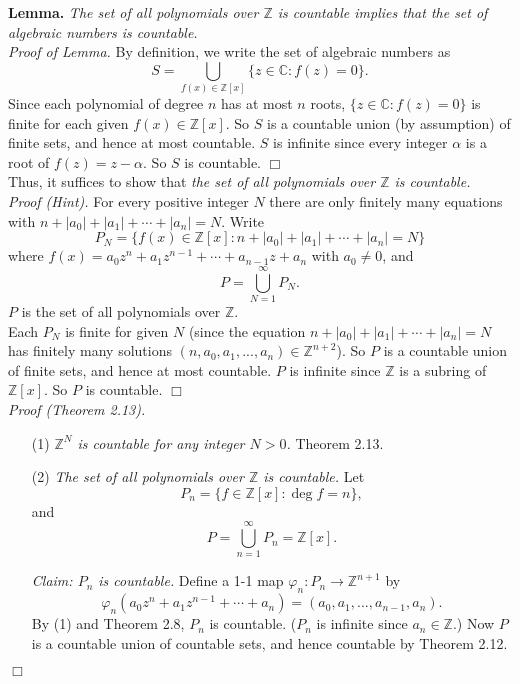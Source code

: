 \documentclass{article}
\begin{document}
\textbf{Lemma.}
\emph{The set of all polynomials over $\mathbb{Z}$ is countable implies that
the set of algebraic numbers is countable.} \\

\emph{Proof of Lemma.}
By definition, we write the set of algebraic numbers as
$$S = \bigcup_{f(x) \in \mathbb{Z}[x]} \{ z \in \mathbb{C} : f(z) = 0 \}.$$
Since each polynomial of degree $n$ has at most $n$ roots,
$\{ z \in \mathbb{C} : f(z) = 0 \}$ is finite for each given $f(x) \in \mathbb{Z}[x]$.
So $S$ is a countable union (by assumption) of finite sets, and hence at most countable.
$S$ is infinite since every integer $\alpha$ is a root of $f(z) = z - \alpha$.
So $S$ is countable.
$\Box$ \\

Thus, it suffices to show that
\emph{the set of all polynomials over $\mathbb{Z}$ is countable.} \\

\emph{Proof (Hint).}
For every positive integer $N$ there are only finitely many equations with
$n + |a_0| + |a_1| + \cdots + |a_n| = N.$
Write
$$P_N = \{ f(x) \in \mathbb{Z}[x] : n + |a_0| + |a_1| + \cdots + |a_n| = N \}$$
where $f(x) = a_0 z^n + a_1 z^{n-1} + \cdots + a_{n-1} z + a_n$ with $a_0 \neq 0$,
and
$$P = \bigcup_{N = 1}^{\infty} P_N.$$
$P$ is the set of all polynomials over $\mathbb{Z}$. \\

Each $P_N$ is finite for given $N$
(since the equation $n + |a_0| + |a_1| + \cdots + |a_n| = N$
has finitely many solutions
$(n, a_0, a_1, ..., a_n) \in \mathbb{Z}^{n+2}$).
So $P$ is a countable union of finite sets, and hence at most countable.
$P$ is infinite since $\mathbb{Z}$ is a subring of $\mathbb{Z}[x]$.
So $P$ is countable.
$\Box$ \\

\emph{Proof (Theorem 2.13).}
\begin{enumerate}
\item[(1)]
\emph{$\mathbb{Z}^N$ is countable for any integer $N > 0$.}
Theorem 2.13.
\item[(2)]
\emph{The set of all polynomials over $\mathbb{Z}$ is countable.}
Let
$$P_n = \{ f \in \mathbb{Z}[x] : \deg f = n \},$$
and
$$P = \bigcup_{n = 1}^{\infty} P_n = \mathbb{Z}[x].$$

\emph{Claim: $P_n$ is countable.}
Define a 1-1 map $\varphi_n: P_n \rightarrow \mathbb{Z}^{n+1}$ by
$$\varphi_n(a_0 z^n + a_1 z^{n-1} + \cdots + a_n)
= (a_0, a_1, ..., a_{n-1}, a_n).$$
By (1) and Theorem 2.8, $P_n$ is countable.
($P_n$ is infinite since $a_n \in \mathbb{Z}$.)
Now $P$ is a countable union of countable sets,
and hence countable by Theorem 2.12.
\end{enumerate}
$\Box$ \\
\end{document}
